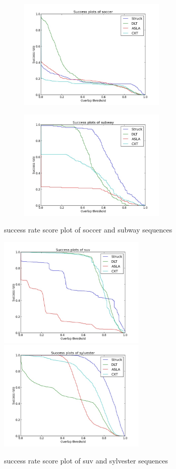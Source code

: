 \documentclass{article}
\begin{document}
\begin{figure}[hbt]
  \begin{subfigure}[b]{0.5\textwidth}
    \includegraphics[width=200pt]{soccer.jpg}
    \label{fig:soccer}
  \end{subfigure}
  \begin{subfigure}[b]{0.5\textwidth}
    \includegraphics[width=200pt]{subway.jpg}
    \label{fig:subway}
  \end{subfigure}
  \caption{success rate score plot of soccer and subway sequences}
\end{figure}

\begin{figure}[hbt]
  \includegraphics[width=200pt]{suv.jpg}
  \includegraphics[width=200pt]{sylvester.jpg}
  \caption{success rate score plot of suv and sylvester sequences}
\end{figure}
\label{fig:sylvester}
\end{document}
